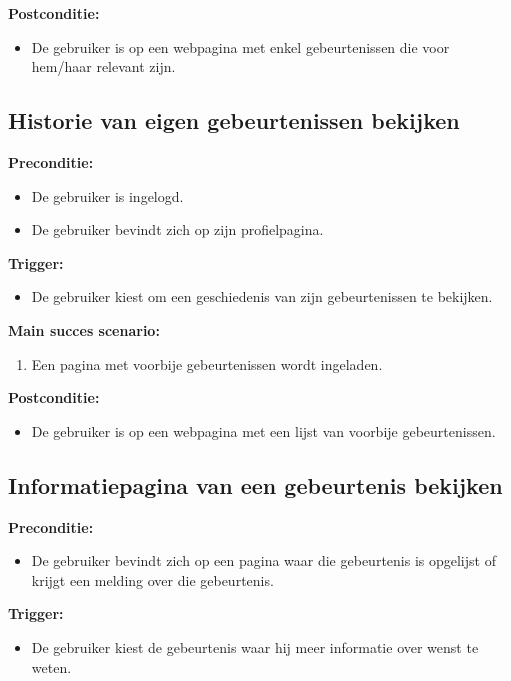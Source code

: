 \documentclass[11pt,twoside,a4paper]{article}
\newcommand{\subpunt}[1]{
	\noindent
	\textbf{\small{#1}}
}
\newenvironment{precond}{
	\subpunt{Preconditie:}
	\begin{itemize}[label={}]
}{
	\end{itemize}
}
\newenvironment{trigger}{
	\subpunt{Trigger:}
	\begin{itemize}[label={}]
}{
	\end{itemize}
}
\newenvironment{mainss}{
	\subpunt{Main succes scenario:}
	\begin{enumerate}
}{
	\end{enumerate}
}
\newenvironment{postcond}{
	\subpunt{Postconditie:}
	\begin{itemize}[label={}]
}{
	\end{itemize}
}
\begin{document}
	\begin{postcond}
		\item De gebruiker is op een webpagina met enkel gebeurtenissen die voor hem/haar relevant zijn.
	\end{postcond}
	
	
	\subsection{Historie van eigen gebeurtenissen bekijken}
	
	\begin{precond}
		\item De gebruiker is ingelogd.
		\item De gebruiker bevindt zich op zijn profielpagina.
	\end{precond}
	
	\begin{trigger}
		\item De gebruiker kiest om een geschiedenis van zijn gebeurtenissen te bekijken.
	\end{trigger}
	
	\begin{mainss}
		\item Een pagina met voorbije gebeurtenissen wordt ingeladen.
	\end{mainss}
	
	\begin{postcond}
		\item De gebruiker is op een webpagina met een lijst van voorbije gebeurtenissen.
	\end{postcond}
	
	
	\subsection{Informatiepagina van een gebeurtenis bekijken}\label{info_event}
	
	\begin{precond}
		\item De gebruiker bevindt zich op een pagina waar die gebeurtenis is opgelijst of krijgt een melding over die gebeurtenis.
	\end{precond}
	
	\begin{trigger}
		\item De gebruiker kiest de gebeurtenis waar hij meer informatie over wenst te weten.
	\end{trigger}
	
\end{document}
